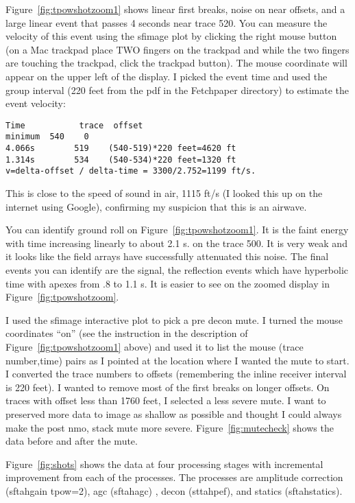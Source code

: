 Figure~\ref{fig:tpowshotzoom1} shows linear first breaks, noise on near offsets, and a large linear event that passes 4 seconds near trace 520.  You can measure the velocity of this event using the sfimage plot by clicking the right mouse button (on a Mac trackpad place TWO fingers on the trackpad and while the two fingers are touching the trackpad, click the trackpad button).  The mouse coordinate will appear on the upper left of the display.  I picked the event time and used the group interval (220 feet from the pdf in the Fetchpaper directory) to estimate the event velocity:

\begin{verbatim}  
Time           trace  offset
minimum  540    0
4.066s        519    (540-519)*220 feet=4620 ft
1.314s        534    (540-534)*220 feet=1320 ft
v=delta-offset / delta-time = 3300/2.752=1199 ft/s.
\end{verbatim}  

This is close to the speed of sound in air, 1115 ft/s (I looked this up on the internet using Google), confirming my suspicion that this is an airwave.   

You can identify ground roll on Figure~\ref{fig:tpowshotzoom1}.  It is the faint energy with time increasing linearly to about 2.1 s. on the trace 500.  It is very weak and it looks like the field arrays have successfully attenuated this noise.  The final events you can identify are the signal, the reflection events which have hyperbolic time with apexes from .8 to 1.1 s.  It is easier to see on the zoomed display in Figure~\ref{fig:tpowshotzoom}.

I used the sfimage interactive plot to pick a pre decon mute.  I turned the mouse coordinates “on” (see the instruction in the description of Figure~\ref{fig:tpowshotzoom1} above) and used it to list the mouse (trace number,time) pairs as I pointed at the location where I wanted the mute to start.  I converted the trace numbers to offsets (remembering the inline receiver interval is 220 feet).  I wanted to remove most of the first breaks on longer offsets.  On traces with offset less than 1760 feet, I selected a less severe mute.  I want to preserved more data to image as shallow as possible and thought I could always make the post nmo, stack mute more severe.  Figure~\ref{fig:mutecheck} shows the data before and after the mute.

Figure~\ref{fig:shots} shows the data at four processing stages with incremental improvement from each of the processes.  The processes are amplitude correction (sftahgain tpow=2), agc (sftahagc) , decon (sttahpef), and statics (sftahstatics).

